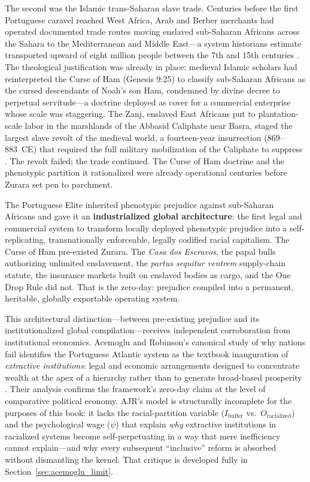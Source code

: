 The second was the Islamic trans-Saharan slave trade. Centuries before the first Portuguese caravel reached West Africa, Arab and Berber merchants had operated documented trade routes moving enslaved sub-Saharan Africans across the Sahara to the Mediterranean and Middle East---a system historians estimate transported upward of eight million people between the 7th and 15th centuries \cite{lewis_race}. The theological justification was already in place: medieval Islamic scholars had reinterpreted the Curse of Ham (Genesis 9:25) to classify sub-Saharan Africans as the cursed descendants of Noah's son Ham, condemned by divine decree to perpetual servitude---a doctrine deployed as cover for a commercial enterprise whose scale was staggering. The Zanj, enslaved East Africans put to plantation-scale labor in the marshlands of the Abbasid Caliphate near Basra, staged the largest slave revolt of the medieval world, a fourteen-year insurrection (869--883~CE) that required the full military mobilization of the Caliphate to suppress \cite{popovic_zanj}. The revolt failed; the trade continued. The Curse of Ham doctrine and the phenotypic partition it rationalized were already operational centuries before Zurara set pen to parchment.

The Portuguese Elite inherited phenotypic prejudice against sub-Saharan Africans and gave it an \textbf{industrialized global architecture}: the first legal and commercial system to transform locally deployed phenotypic prejudice into a self-replicating, transnationally enforceable, legally codified racial capitalism. The Curse of Ham pre-existed Zurara. The \textit{Casa dos Escravos}, the papal bulls authorizing unlimited enslavement, the \textit{partus sequitur ventrem} supply-chain statute, the insurance markets built on enslaved bodies as cargo, and the One Drop Rule did not. That is the zero-day: prejudice compiled into a permanent, heritable, globally exportable operating system.

This architectural distinction---between pre-existing prejudice and its institutionalized global compilation---receives independent corroboration from institutional economics. Acemoglu and Robinson's canonical study of why nations fail identifies the Portuguese Atlantic system as the textbook inauguration of \textit{extractive institutions}: legal and economic arrangements designed to concentrate wealth at the apex of a hierarchy rather than to generate broad-based prosperity \cite{acemoglu_robinson}. Their analysis confirms the framework's zero-day claim at the level of comparative political economy. AJR's model is structurally incomplete for the purposes of this book: it lacks the racial-partition variable ($I_{\text{buffer}}$ vs.\ $O_{\text{racialized}}$) and the psychological wage ($\psi$) that explain \textit{why} extractive institutions in racialized systems become self-perpetuating in a way that mere inefficiency cannot explain---and why every subsequent ``inclusive'' reform is absorbed without dismantling the kernel. That critique is developed fully in Section~\ref{sec:acemoglu_limit}.

